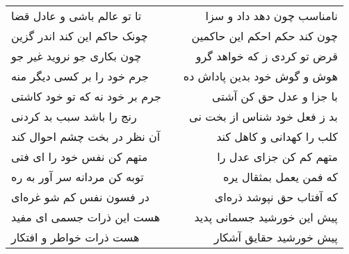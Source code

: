 \begin{center}
\begin{longtable}{l p{0.5cm} r}
\\
تا تو عالم باشی و عادل قضا
&&
نامناسب چون دهد داد و سزا
\\
چونک حاکم این کند اندر گزین
&&
چون کند حکم احکم این حاکمین
\\
چون بکاری جو نروید غیر جو
&&
قرض تو کردی ز که خواهد گرو
\\
جرم خود را بر کسی دیگر منه
&&
هوش و گوش خود بدین پاداش ده
\\
جرم بر خود نه که تو خود کاشتی
&&
با جزا و عدل حق کن آشتی
\\
رنج را باشد سبب بد کردنی
&&
بد ز فعل خود شناس از بخت نی
\\
آن نظر در بخت چشم احوال کند
&&
کلب را کهدانی و کاهل کند
\\
متهم کن نفس خود را ای فتی
&&
متهم کم کن جزای عدل را
\\
توبه کن مردانه سر آور به ره
&&
که فمن یعمل بمثقال یره
\\
در فسون نفس کم شو غره‌ای
&&
که آفتاب حق نپوشد ذره‌ای
\\
هست این ذرات جسمی ای مفید
&&
پیش این خورشید جسمانی پدید
\\
هست ذرات خواطر و افتکار
&&
پیش خورشید حقایق آشکار
\\
\end{longtable}
\end{center}
